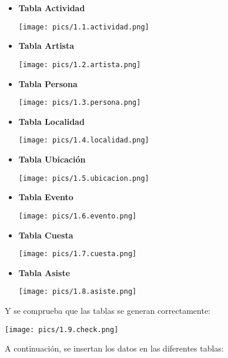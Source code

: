 \documentclass[12pt]{article}
\begin{document}
    \begin{itemize}
        \item \textbf{Tabla Actividad}
        \begin{center}{\texttt{[image: pics/1.1.actividad.png]}}\end{center}
        \item \textbf{Tabla Artista}
        \begin{center}{\texttt{[image: pics/1.2.artista.png]}}\end{center}
        \item \textbf{Tabla Persona}
        \begin{center}{\texttt{[image: pics/1.3.persona.png]}}\end{center}
        \item \textbf{Tabla Localidad}
        \begin{center}{\texttt{[image: pics/1.4.localidad.png]}}\end{center}
        \item \textbf{Tabla Ubicación}
        \begin{center}{\texttt{[image: pics/1.5.ubicacion.png]}}\end{center}
        \item \textbf{Tabla Evento}
        \begin{center}{\texttt{[image: pics/1.6.evento.png]}}\end{center}
        \item \textbf{Tabla Cuesta}
        \begin{center}{\texttt{[image: pics/1.7.cuesta.png]}}\end{center}
        \item \textbf{Tabla Asiste}
        \begin{center}{\texttt{[image: pics/1.8.asiste.png]}}\end{center}
    \end{itemize}

    Y se comprueba que las tablas se generan correctamente:

    \begin{center}{\texttt{[image: pics/1.9.check.png]}}\end{center}

    A continuación, se insertan los datos en las diferentes tablas:
\end{document}
